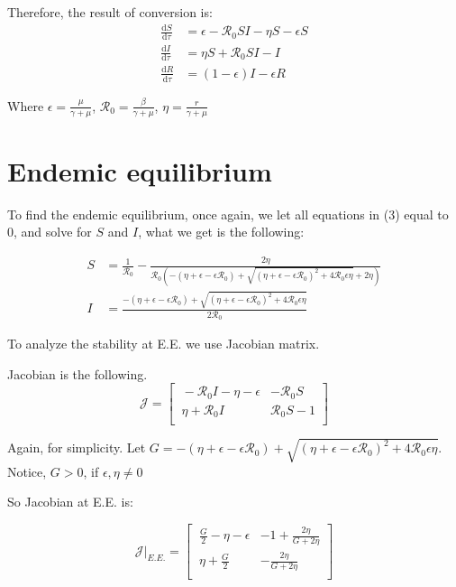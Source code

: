 \documentclass[12pt]{article}
\newcommand\dbyd[2]{\frac{\mathrm d{#1}}{\mathrm d{#2}}}
\newcommand{\R}{\mathcal{R}}
\begin{document}
Therefore, the result of conversion is:
\begin{equation}
\begin{split}
\dbyd{S}{\tau}&=\epsilon- \R_0  SI-\eta S-\epsilon S \\
\dbyd{I}{\tau}&=\eta S+\R_0 SI-I\\
\dbyd{R}{\tau}&=(1-\epsilon)I-\epsilon R
\end{split}
\end{equation}

Where $\epsilon=\frac{\mu}{\gamma+\mu}$, $\R_0=\frac{\beta}{\gamma+\mu}$, $\eta=\frac{r}{\gamma+\mu}$

\section{Endemic equilibrium}
To find the endemic equilibrium, once again, we let all equations in (3) equal to 0, and solve for $S$ and $I$, what we get is the following:

\begin{align}
S &= \frac{1}{\R_0}-\frac{2\eta}{\R_0(-(\eta+\epsilon-\epsilon\R_0)+\sqrt{(\eta+\epsilon-\epsilon\R_0)^2+4\R_0\epsilon \eta}+2\eta)}\\
I &= \frac{-(\eta+\epsilon-\epsilon\R_0)+\sqrt{(\eta+\epsilon-\epsilon\R_0)^2+4\R_0\epsilon \eta}}{2\R_0}
\end{align}

To analyze the stability at E.E. we use Jacobian matrix.

Jacobian is the following.
\begin{equation}
\mathcal{J} =
\begin{bmatrix}
    \ -\R_0 I-\eta-\epsilon       & -\R_0 S \\
    \ \eta+\R_0 I       & \R_0 S-1 \\
\end{bmatrix}
\end{equation}

Again, for simplicity. Let $G=-(\eta+\epsilon-\epsilon\R_0)+\sqrt{(\eta+\epsilon-\epsilon\R_0)^2+4\R_0\epsilon \eta}$. Notice, $G>0$, if $\epsilon,\eta\neq 0$

So Jacobian at E.E. is:

\begin{equation}
\mathcal{J}|_{E.E.}=
\begin{bmatrix}
    \ \frac{G}{2}-\eta-\epsilon       & -1+\frac{2\eta}{G+2\eta} \\
    \ \eta+\frac{G}{2}       & -\frac{2\eta}{G+2\eta} \\
\end{bmatrix}
\end{equation}
\end{document}
